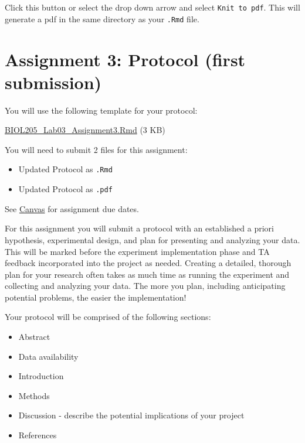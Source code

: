 \documentclass[
]{book}
\providecommand{\tightlist}{%
  \setlength{\itemsep}{0pt}\setlength{\parskip}{0pt}}
\begin{document}
Click this button or select the drop down arrow and select \texttt{Knit\ to\ pdf}. This will generate a pdf in the same directory as your \texttt{.Rmd} file.

\hypertarget{assignment-3-protocol-first-submission}{%
\chapter*{Assignment 3: Protocol (first submission)}\label{assignment-3-protocol-first-submission}}

You will use the following template for your protocol:

\href{https://osf.io/download/qhc2v}{BIOL205\_Lab03\_Assignment3.Rmd} (3 KB)

You will need to submit 2 files for this assignment:

\begin{itemize}
\tightlist
\item
  Updated Protocol as \texttt{.Rmd}
\item
  Updated Protocol as \texttt{.pdf}
\end{itemize}

See \href{https://canvas.ubc.ca}{Canvas} for assignment due dates.

For this assignment you will submit a protocol with an established a priori hypothesis, experimental design, and plan for presenting and analyzing your data. This will be marked before the experiment implementation phase and TA feedback incorporated into the project as needed. Creating a detailed, thorough plan for your research often takes as much time as running the experiment and collecting and analyzing your data. The more you plan, including anticipating potential problems, the easier the implementation!

Your protocol will be comprised of the following sections:

\begin{itemize}
\tightlist
\item
  Abstract
\item
  Data availability
\item
  Introduction
\item
  Methods
\item
  Discussion - describe the potential implications of your project
\item
  References
\end{itemize}
\end{document}

